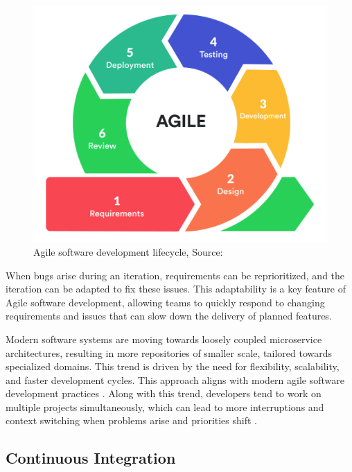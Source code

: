 \begin{figure}[H]
    \centering
    \includegraphics[width=1\textwidth]{images/agile-cycle.png}
    \caption{Agile software development lifecycle, Source: \cite{7MistakesIve2020}}
    \label{fig:agile-cycle}
\end{figure}

When bugs arise during an iteration, requirements can be reprioritized, and the iteration can be adapted to fix these issues. This adaptability is a key feature of Agile software development, allowing teams to quickly respond to changing requirements and issues that can slow down the delivery of planned features. %

Modern software systems are moving towards loosely coupled microservice architectures, resulting in more repositories of smaller scale, tailored towards specialized domains. This trend is driven by the need for flexibility, scalability, and faster development cycles. This approach aligns with modern agile software development practices \cite{francescoResearchArchitectingMicroservices2017}. Along with this trend, developers tend to work on multiple projects simultaneously, which can lead to more interruptions and context switching when problems arise and priorities shift \cite{tregubovImpactTaskSwitching2017, vasilescuSkyNotLimit2016}.

\subsection{Continuous Integration}

